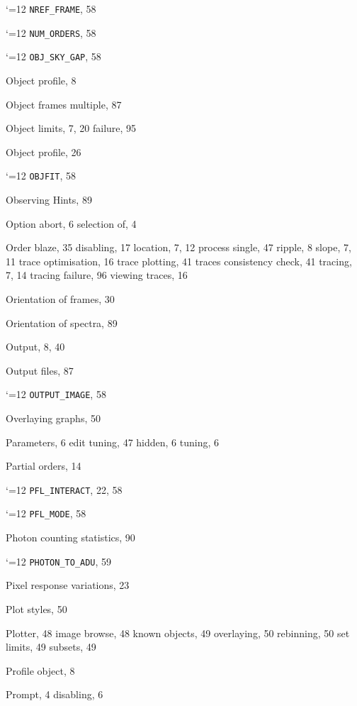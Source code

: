 \documentclass[twoside,11pt]{article}
\renewcommand{\_}{\texttt{\symbol{95}}}
\newcommand{\cmdname}{\begingroup \catcode`\_=12 \realcmdname}
\newcommand{\realcmdname}[1]{\endgroup\texttt{#1}}
\newcommand{\cmdname}[1]{#1}
\begin{document}
\begin{theindex}
  \indexspace

  \item \cmdname {NREF_FRAME}, 58
  \item \cmdname {NUM_ORDERS}, 58

  \indexspace

  \item \cmdname {OBJ_SKY_GAP}, 58
  \item Object
    \subitem profile, 8
  \item Object frames
    \subitem multiple, 87
  \item Object limits, 7, 20
    \subitem failure, 95
  \item Object profile, 26
  \item \cmdname {OBJFIT}, 58
  \item Observing Hints, 89
  \item Option
    \subitem abort, 6
    \subitem selection of, 4
  \item Order
    \subitem blaze, 35
    \subitem disabling, 17
    \subitem location, 7, 12
    \subitem process single, 47
    \subitem ripple, 8
    \subitem slope, 7, 11
    \subitem trace optimisation, 16
    \subitem trace plotting, 41
    \subitem traces consistency check, 41
    \subitem tracing, 7, 14
    \subitem tracing failure, 96
    \subitem viewing traces, 16
  \item Orientation of frames, 30
  \item Orientation of spectra, 89
  \item Output, 8, 40
  \item Output files, 87
  \item \cmdname {OUTPUT_IMAGE}, 58
  \item Overlaying graphs, 50

  \indexspace

  \item Parameters, 6
    \subitem edit tuning, 47
    \subitem hidden, 6
    \subitem tuning, 6
  \item Partial orders, 14
  \item \cmdname {PFL_INTERACT}, 22, 58
  \item \cmdname {PFL_MODE}, 58
  \item Photon counting statistics, 90
  \item \cmdname {PHOTON_TO_ADU}, 59
  \item Pixel response variations, 23
  \item Plot styles, 50
  \item Plotter, 48
    \subitem image browse, 48
    \subitem known objects, 49
    \subitem overlaying, 50
    \subitem rebinning, 50
    \subitem set limits, 49
    \subitem subsets, 49
  \item Profile
    \subitem object, 8
  \item Prompt, 4
    \subitem disabling, 6


\end{theindex}
\end{document}
